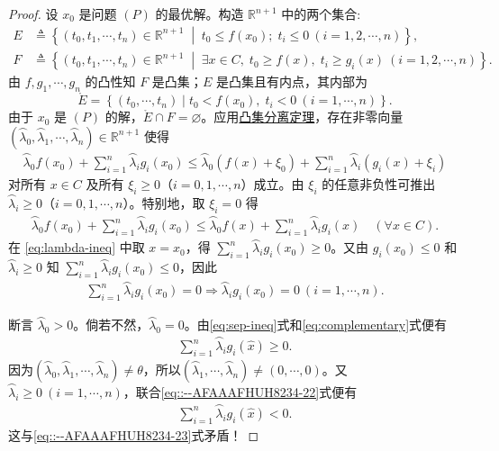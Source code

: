 \documentclass[../../main.tex]{subfiles}%
\begin{document}
\begin{proof}

设 $x_0$ 是问题 $(P)$ 的最优解。构造 $\mathbb{R}^{n+1}$ 中的两个集合:
\begin{align*}
E &\triangleq \left\{ (t_0, t_1, \cdots, t_n) \in \mathbb{R}^{n+1} \;\middle|\; t_0 \leqslant f(x_0);\; t_i \leqslant 0 \ (i=1,2,\cdots,n) \right\}, \\
F &\triangleq \left\{ (t_0, t_1, \cdots, t_n) \in \mathbb{R}^{n+1} \;\middle|\; \exists x \in C,\; t_0 \geqslant f(x),\; t_i \geqslant g_i(x) \ (i=1,2,\cdots,n) \right\}.
\end{align*}
由 $f, g_1, \cdots, g_n$ 的凸性知 $F$ 是凸集；$E$ 是凸集且有内点，其内部为
\[
\mathring{E} = \left\{ (t_0, \cdots, t_n) \mid t_0 < f(x_0),\; t_i < 0 \ (i=1,\cdots,n) \right\}.
\]
由于 $x_0$ 是 $(P)$ 的解，$\mathring{E} \cap F = \varnothing$。应用\hyperref[theorem:泛函分析--凸集分离定理]{凸集分离定理}，存在非零向量 $(\wideparen{\lambda}_0, \wideparen{\lambda}_1, \cdots, \wideparen{\lambda}_n) \in \mathbb{R}^{n+1}$ 使得
\begin{align}\label{eq:sep-ineq}
\wideparen{\lambda}_0 f(x_0) + \sum_{i=1}^n \wideparen{\lambda}_i g_i(x_0) \leqslant \wideparen{\lambda}_0 (f(x)+\xi_0) + \sum_{i=1}^n \wideparen{\lambda}_i (g_i(x)+\xi_i)
\end{align}
对所有 $x \in C$ 及所有 $\xi_i \geqslant 0$（$i=0,1,\cdots,n$）成立。由 $\xi_i$ 的任意非负性可推出 $\wideparen{\lambda}_i \geqslant 0$（$i=0,1,\cdots,n$）。特别地，取 $\xi_i=0$ 得
\begin{align}\label{eq:lambda-ineq}
\wideparen{\lambda}_0 f(x_0) + \sum_{i=1}^n \wideparen{\lambda}_i g_i(x_0) \leqslant \wideparen{\lambda}_0 f(x) + \sum_{i=1}^n \wideparen{\lambda}_i g_i(x) \quad (\forall x \in C).
\end{align}
在 \eqref{eq:lambda-ineq} 中取 $x = x_0$，得 $\sum_{i=1}^n \wideparen{\lambda}_i g_i(x_0) \geqslant 0$。又由 $g_i(x_0) \leqslant 0$ 和 $\wideparen{\lambda}_i \geqslant 0$ 知 $\sum_{i=1}^n \wideparen{\lambda}_i g_i(x_0) \leqslant 0$，因此
\begin{align}\label{eq:complementary}
\sum_{i=1}^n \wideparen{\lambda}_i g_i(x_0) = 0\Longrightarrow  \wideparen{\lambda}_i g_i(x_0)=0 \ (i=1,\cdots,n).
\end{align}

断言 $\wideparen{\lambda}_0 > 0$。倘若不然，$\wideparen{\lambda}_0 = 0$。由\eqref{eq:sep-ineq}式和\eqref{eq:complementary}式便有
\begin{align}
\sum\limits_{i=1}^n \wideparen{\lambda}_i g_i(\widehat{x}) \geqslant 0.
\label{eq::--AFAAAFHUH8234-23}
\end{align}
因为$(\wideparen{\lambda}_0, \wideparen{\lambda}_1, \cdots, \wideparen{\lambda}_n) \neq \theta$，所以$(\wideparen{\lambda}_1, \cdots, \wideparen{\lambda}_n) \neq (0,\cdots,0)$。又$\wideparen{\lambda}_i \geqslant 0 \ (i=1,\cdots,n)$，联合\eqref{eq::--AFAAAFHUH8234-22}式便有
\begin{align*}
\sum\limits_{i=1}^n \wideparen{\lambda}_i g_i(\widehat{x}) < 0.
\end{align*}
这与\eqref{eq::--AFAAAFHUH8234-23}式矛盾！


\end{proof}
\end{document}
